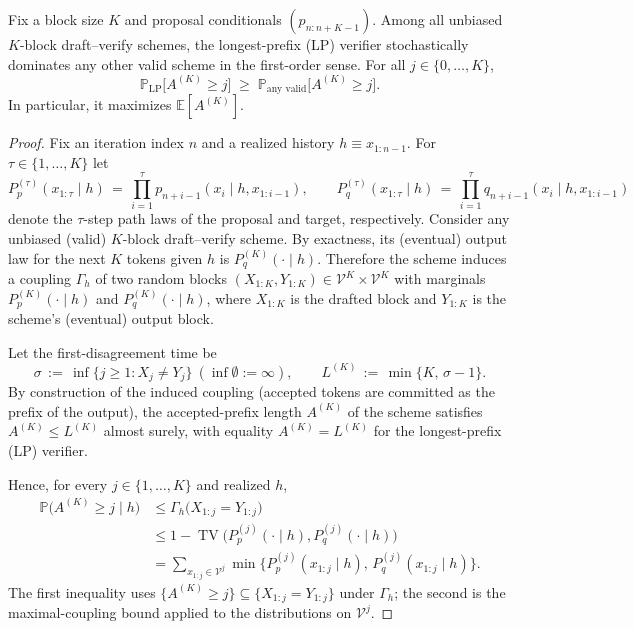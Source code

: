 \begin{theorem}\label{thm:longest-prefix-domination}
\sloppy
Fix a block size $K$ and proposal conditionals $(p_{n:n+K-1})$. Among all unbiased $K$-block draft--verify schemes, the longest-prefix (LP) verifier stochastically dominates any other valid scheme in the first-order sense. For all $j\in\{0,\dots,K\}$,
\[
\mathbb{P}_{\mathrm{LP}}\big[A^{(K)}\ge j\big] \;\ge\; \mathbb{P}_{\text{any valid}}\big[A^{(K)}\ge j\big].
\]
In particular, it maximizes $\mathbb{E}[A^{(K)}]$.
\end{theorem}

\begin{proof}
Fix an iteration index $n$ and a realized history $h\equiv x_{1:n-1}$. For $\tau\in\{1,\dots,K\}$ let
\[
P_p^{(\tau)}(x_{1:\tau}\mid h) \,=\, \prod_{i=1}^{\tau} p_{n+i-1}(x_i\mid h, x_{1:i-1}),\qquad
P_q^{(\tau)}(x_{1:\tau}\mid h) \,=\, \prod_{i=1}^{\tau} q_{n+i-1}(x_i\mid h, x_{1:i-1})
\]
denote the $\tau$-step path laws of the proposal and target, respectively. Consider any unbiased (valid) $K$-block draft--verify scheme. By exactness, its (eventual) output law for the next $K$ tokens given $h$ is $P_q^{(K)}(\cdot\mid h)$. Therefore the scheme induces a coupling $\Gamma_h$ of two random blocks $(X_{1:K},Y_{1:K})\in\mathcal V^K\times\mathcal V^K$ with marginals $P_p^{(K)}(\cdot\mid h)$ and $P_q^{(K)}(\cdot\mid h)$, where $X_{1:K}$ is the drafted block and $Y_{1:K}$ is the scheme's (eventual) output block.

Let the first-disagreement time be
\[
\sigma\,:=\,\inf\{j\ge 1: X_j\ne Y_j\}\ (\inf\emptyset:=\infty),\qquad L^{(K)}\,:=\,\min\{K,\,\sigma-1\}.
\]
By construction of the induced coupling (accepted tokens are committed as the prefix of the output), the accepted-prefix length $A^{(K)}$ of the scheme satisfies $A^{(K)}\le L^{(K)}$ almost surely, with equality $A^{(K)}=L^{(K)}$ for the longest-prefix (LP) verifier.

Hence, for every $j\in\{1,\dots,K\}$ and realized $h$,
\begin{equation}
\begin{aligned}
\mathbb P\big(A^{(K)}\ge j\mid h\big)
&\le \Gamma_h\big(X_{1:j}=Y_{1:j}\big)\\
&\le 1-\operatorname{TV}\big(P_p^{(j)}(\cdot\mid h),P_q^{(j)}(\cdot\mid h)\big)\\
&= \sum_{x_{1:j}\in\mathcal V^j} \min\Big\{P_p^{(j)}(x_{1:j}\mid h),\,P_q^{(j)}(x_{1:j}\mid h)\Big\}.
\end{aligned}
\tag{1}
\end{equation}
The first inequality uses $\{A^{(K)}\ge j\}\subseteq\{X_{1:j}=Y_{1:j}\}$ under $\Gamma_h$; the second is the maximal-coupling bound applied to the distributions on $\mathcal V^j$.


\end{proof}
